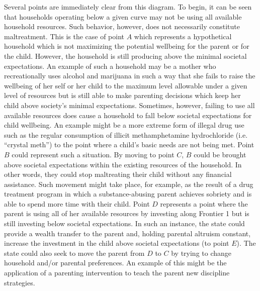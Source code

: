 \documentclass[]{elsarticle}
\begin{document}


Several points are immediately clear from this diagram. To begin, it can
be seen that households operating below a given curve may not be using
all available household resources. Such behavior, however, does not
necessarily constitute maltreatment. This is the case of point $A$ which
represents a hypothetical household which is not maximizing the
potential wellbeing for the parent or for the child. However, the
household is still producing above the minimal societal expectations. An
example of such a household may be a mother who recreationally uses
alcohol and marijuana in such a way that she fails to raise the
wellbeing of her self or her child to the maximum level allowable under
a given level of resources but is still able to make parenting decisions
which keep her child above society's minimal expectations. Sometimes,
however, failing to use all available resources does cause a household
to fall below societal expectations for child wellbeing. An example
might be a more extreme form of illegal drug use such as the regular
consumption of illicit methamphetamine hydrochloride (i.e. ``crystal
meth'') to the point where a child's basic needs are not being met.
Point $B$ could represent such a situation. By moving to point $C$, $B$
could be brought above societal expectations within the existing
resources of the household. In other words, they could stop maltreating
their child without any financial assistance. Such movement might take
place, for example, as the result of a drug treatment program in which a
substance-abusing parent achieves sobriety and is able to spend more
time with their child. Point $D$ represents a point where the parent is
using all of her available resources by investing along Frontier 1 but
is still investing below societal expectations. In such an instance, the
state could provide a wealth transfer to the parent and, holding
parental altruism constant, increase the investment in the child above
societal expectations (to point $E$). The state could also seek to move
the parent from $D$ to $C$ by trying to change household and/or parental
preferences. An example of this might be the application of a parenting
intervention to teach the parent new discipline strategies.
\end{document}
